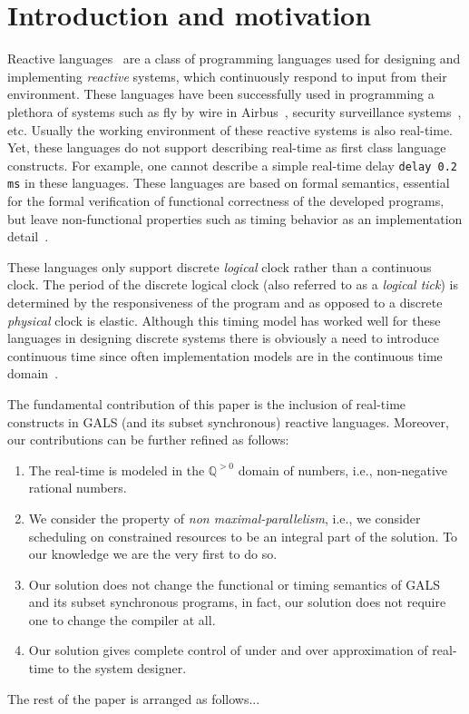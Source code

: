 \section{Introduction and motivation}
\label{sec:intr-motiv}

Reactive languages~\cite{gber05,amal10} are a class of programming
languages used for designing and implementing \textit{reactive} systems,
which continuously respond to input from their environment. These
languages have been successfully used in programming a plethora of
systems such as fly by wire in Airbus~\cite{eairbus}, security
surveillance systems~\cite{amal121}, etc. Usually the working
environment of these reactive systems is also real-time. Yet, these
languages do not support describing real-time as first class language
constructs. For example, one cannot describe a simple real-time delay
\texttt{delay 0.2 ms} in these languages. These languages are based on
formal semantics, essential for the formal verification of functional
correctness of the developed programs, but leave non-functional
properties such as timing behavior as an implementation
detail~\cite{ringler00,boldt07}.

These languages only support discrete \textit{logical} clock rather than
a continuous clock. The period of the discrete logical clock (also
referred to as a \textit{logical tick}) is determined by the
responsiveness of the program and as opposed to a discrete
\textit{physical} clock is elastic. Although this timing model has
worked well for these languages in designing discrete systems there is
obviously a need to introduce continuous time since often implementation
models are in the continuous time
domain~\cite{DBLP:journals/pieee/SifakisTY03}.



The fundamental contribution of this paper is the inclusion of real-time
constructs in GALS (and its subset synchronous) reactive
languages. Moreover, our contributions can be further refined as
follows:

\begin{enumerate}
\item The real-time is modeled in the $\mathbb{Q}^{>0}$ domain of
  numbers, i.e., non-negative rational numbers.
\item We consider the property of \textit{non maximal-parallelism},
  i.e., we consider scheduling on constrained resources to be an
  integral part of the solution. To our knowledge we are the very first
  to do so.
\item Our solution does not change the functional or timing semantics of
  GALS and its subset synchronous programs, in fact, our solution does
  not require one to change the compiler at all.
\item Our solution gives complete control of under and over
  approximation of real-time to the system designer.
\end{enumerate}

The rest of the paper is arranged as follows...


